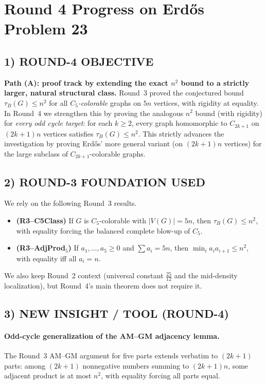 \section{Round 4 Progress on Erd\H{o}s Problem 23}

\subsection*{1) ROUND-4 OBJECTIVE}
\textbf{Path (A): proof track by extending the exact $n^2$ bound to a strictly larger,
natural structural class.}
Round~3 proved the conjectured bound $\tau_B(G)\le n^2$ for all \emph{$C_5$-colorable}
graphs on $5n$ vertices, with rigidity at equality.
In Round~4 we strengthen this by proving the analogous $n^2$ bound (with rigidity)
for \emph{every odd cycle target}: for each $k\ge 2$, every graph homomorphic to $C_{2k+1}$
on $(2k+1)n$ vertices satisfies $\tau_B(G)\le n^2$.
This strictly advances the investigation by proving Erd\H{o}s' more general variant
(on $(2k+1)n$ vertices) for the large subclass of $C_{2k+1}$-colorable graphs.

\subsection*{2) ROUND-3 FOUNDATION USED}
We rely on the following Round~3 results.
\begin{itemize}
\item \textbf{(R3--C5Class)} If $G$ is $C_5$-colorable with $|V(G)|=5n$, then $\tau_B(G)\le n^2$,
      with equality forcing the balanced complete blow-up of $C_5$.
\item \textbf{(R3--AdjProd$_5$)} If $a_1,\dots,a_5\ge 0$ and $\sum a_i=5n$, then
      $\min_i a_i a_{i+1}\le n^2$, with equality iff all $a_i=n$.
\end{itemize}
We also keep Round~2 context (universal constant $\frac{25}{12}$ and the mid-density
localization), but Round~4's main theorem does not require it.

\subsection*{3) NEW INSIGHT / TOOL (ROUND-4)}
\paragraph{Odd-cycle generalization of the AM--GM adjacency lemma.}
The Round~3 AM--GM argument for five parts extends verbatim to $(2k+1)$ parts:
among $(2k+1)$ nonnegative numbers summing to $(2k+1)n$, some adjacent product
is at most $n^2$, with equality forcing all parts equal.

